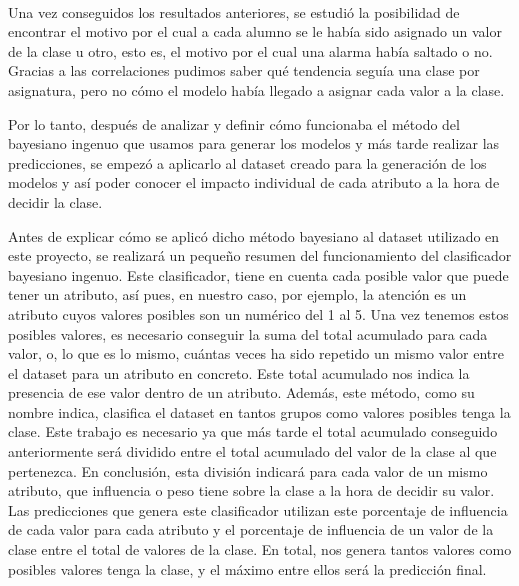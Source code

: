 \paragraph{}
Una vez conseguidos los resultados anteriores, se estudió la
posibilidad de encontrar el motivo por el cual a cada alumno se le
había sido asignado un valor de la clase u otro, esto es, el motivo
por el cual una alarma había saltado o no. Gracias a las correlaciones
pudimos saber qué tendencia seguía una clase por asignatura, pero no
cómo el modelo había llegado a asignar cada valor a la clase.

Por lo tanto, después de analizar y definir cómo funcionaba el método
del bayesiano ingenuo que usamos para generar los modelos y más tarde
realizar las predicciones, se empezó a aplicarlo al dataset creado
para la generación de los modelos y así poder conocer el impacto
individual de cada atributo a la hora de decidir la clase.

Antes de explicar cómo se aplicó dicho método bayesiano al dataset
utilizado en este proyecto, se realizará un pequeño resumen del
funcionamiento del clasificador bayesiano ingenuo. Este clasificador,
tiene en cuenta cada posible valor que puede tener un atributo, así
pues, en nuestro caso, por ejemplo, la atención es un atributo cuyos
valores posibles son un numérico del 1 al 5. Una vez tenemos estos
posibles valores, es necesario conseguir la suma del total acumulado
para cada valor, o, lo que es lo mismo, cuántas veces ha sido repetido
un mismo valor entre el dataset para un atributo en concreto. Este
total acumulado nos indica la presencia de ese valor dentro de un
atributo. Además, este método, como su nombre indica, clasifica el
dataset en tantos grupos como valores posibles tenga la clase. Este
trabajo es necesario ya que más tarde el total acumulado conseguido
anteriormente será dividido entre el total acumulado del valor de la
clase al que pertenezca. En conclusión, esta división indicará para
cada valor de un mismo atributo, que influencia o peso tiene sobre la
clase a la hora de decidir su valor. Las predicciones que genera este
clasificador utilizan este porcentaje de influencia de cada valor para
cada atributo y el porcentaje de influencia de un valor de la clase
entre el total de valores de la clase. En total, nos genera tantos
valores como posibles valores tenga la clase, y el máximo entre ellos
será la predicción final.


